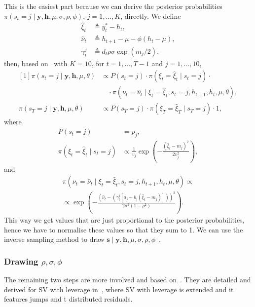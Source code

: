 This is the easiest part because we can derive the posterior probabilities $\pi(s_t=j\mid\bm{y},\bm{h},\mu,\sigma,\rho,\phi)$, $j=1,\dots,K$, directly.
We define
\begin{align*}
\hat\xi_t &\triangleq y_t^\ast-h_t, \\
\hat{\nu}_t &\triangleq h_{t+1}-\mu-\phi(h_t-\mu), \\
\gamma_t^j &\triangleq d_t\rho\sigma\exp(m_j/2),
\end{align*}
then, based on~\citet{Omori2007} with $K=10$, for $t=1,\dots,T-1$ and $j=1,\dots,10$,
\begin{equation}
\begin{aligned}[1]
\pi\left(s_t=j\mid\bm{y},\bm{h},\mu,\theta\right) &\propto P\left(s_t=j\right)\cdot\pi\left(\xi_t=\hat\xi_t\mid s_t=j\right)\cdot \\
&\quad\cdot\pi\left(\nu_t=\hat\nu_t\mid\xi_t=\hat\xi_t,s_t=j,h_{t+1},h_t,\mu,\theta\right), \\
\pi\left(s_T=j\mid\bm{y},\bm{h},\mu,\theta\right)
&\propto P\left(s_T=j\right)\cdot\pi\left(\xi_T=\hat\xi_T\mid s_T=j\right)\cdot 1,
\end{aligned}
\end{equation}
where
\begin{align*}
P\left(s_t=j\right) &= p_j, \\
\pi\left(\xi_t=\hat\xi_t\mid s_t=j\right) &\propto \frac{1}{v_j}\exp\left(-\frac{\left(\hat\xi_t-m_j\right)^2}{2v_j^2}\right),
\end{align*}
and
\begin{multline*}
\pi\left(\nu_t=\hat\nu_t\mid\xi_t=\hat\xi_t,s_t=j,h_{t+1},h_t,\mu,\theta\right) \propto \\
\propto \exp\left(-\frac{\left(\hat{\nu}_t-\left(\gamma_t^j\left[a_j+b_j\left(\hat\xi_t-m_j\right)\right]\right)\right)^2}{2\sigma^2\left(1-\rho^2\right)}\right).
\end{multline*}
This way we get values that are just proportional to the posterior probabilities, hence we have to normalise these values so that they sum to 1.
We can use the inverse sampling method to draw $\bm s\mid\bm{y},\bm{h},\mu,\sigma,\rho,\phi$~\citep{grinstead2012introduction}.

\subsubsection{Drawing $\rho,\sigma,\phi$}

The remaining two steps are more involved and based on~\citet{de1995simulation}.
They are detailed and derived for SV with leverage in~\citet{Nakajima2009}, where SV with leverage is extended and it features jumps and t distributed residuals.


